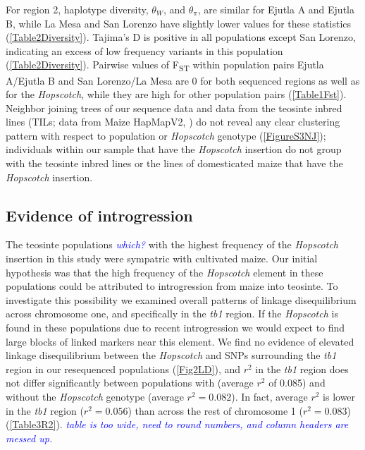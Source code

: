\documentclass[11pt]{article}
\newcommand{\jri}[1]{\textcolor{blue}{ \emph{\scriptsize  #1}} }
\begin{document}
\begin{linenumbers}
\begin{flushleft}
For region 2, haplotype diversity, $\theta_W$, and $\theta_\pi$, are similar for Ejutla A and Ejutla B, while La Mesa and San Lorenzo have slightly lower values for these statistics (\ref{Table2Diversity}). Tajima's D is positive in all populations except San Lorenzo, indicating an excess of low frequency variants in this population (\ref{Table2Diversity}). Pairwise values of F\textsubscript{ST} within population pairs Ejutla A/Ejutla B and San Lorenzo/La Mesa are 0 for both sequenced regions as well as for the \emph{Hopscotch}, while they are high for other population pairs (\ref{Table1Fst}). Neighbor joining trees of our sequence data and data from the teosinte inbred lines (TILs; data from Maize HapMapV2, \citep{Chia2012}) do not reveal any clear clustering pattern with respect to population or \emph{Hopscotch} genotype (\ref{FigureS3NJ}); individuals within our sample that have the \emph{Hopscotch} insertion do not group with the teosinte inbred lines or the lines of domesticated maize that have the \emph{Hopscotch} insertion. 

\subsection*{Evidence of introgression}

The teosinte populations \jri{which?} with the highest frequency of the \emph{Hopscotch} insertion in this study were sympatric with cultivated maize. Our initial hypothesis was that the high frequency of the \emph{Hopscotch} element in these populations could be attributed to introgression from maize into teosinte. To investigate this possibility we examined overall patterns of linkage disequilibrium across chromosome one, and specifically in the \emph{tb1} region. If the \emph{Hopscotch} is found in these populations due to recent introgression we would expect to find large blocks of linked markers near this element. We find no evidence of elevated linkage disequilibrium between the \emph{Hopscotch} and SNPs surrounding the \emph{tb1} region in our resequenced populations (\ref{Fig2LD}), and $r^{2}$ in the \emph{tb1} region  does not differ significantly between populations with (average $r^{2}$ of 0.085) and without the \emph{Hopscotch} genotype (average $r^{2}=0.082$). In fact, average $r^{2}$ is lower in the \emph{tb1} region ($r^{2}=0.056$) than across the rest of chromosome 1 ($r^{2}=0.083$) (\ref{Table3R2}). \jri{table is too wide, need to round numbers, and column headers are messed up.}


\end{flushleft}
\end{linenumbers}
\end{document}
